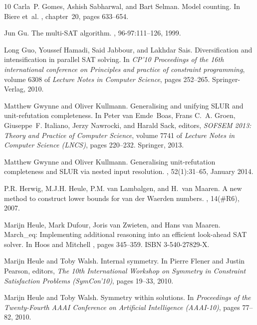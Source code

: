\documentclass[final,3p,times]{elsarticle}
\theoremstyle{definition}
\begin{document}
\begin{thebibliography}{10}
Carla~P. Gomes, Ashish Sabharwal, and Bart Selman.
\newblock Model counting.
\newblock In Biere et~al. \cite{2008HandbuchSAT}, chapter~20, pages 633--654.

Jun Gu.
\newblock The multi-{SAT} algorithm.
, 96-97:111--126, 1999.

Long Guo, Youssef Hamadi, Said Jabbour, and Lakhdar Sais.
\newblock Diversification and intensification in parallel {SAT} solving.
\newblock In {\em CP'10 Proceedings of the 16th international conference on
  Principles and practice of constraint programming}, volume 6308 of {\em
  Lecture Notes in Computer Science}, pages 252--265. Springer-Verlag, 2010.

Matthew Gwynne and Oliver Kullmann.
\newblock Generalising and unifying {SLUR} and unit-refutation completeness.
\newblock In Peter van Emde~Boas, Frans C.~A. Groen, Giuseppe~F. Italiano,
  Jerzy Nawrocki, and Harald Sack, editors, {\em SOFSEM 2013: Theory and
  Practice of Computer Science}, volume 7741 of {\em Lecture Notes in Computer
  Science (LNCS)}, pages 220--232. Springer, 2013.

Matthew Gwynne and Oliver Kullmann.
\newblock Generalising unit-refutation completeness and {SLUR} via nested input
  resolution.
, 52(1):31--65, January 2014.

P.R. Herwig, M.J.H. Heule, P.M. van Lambalgen, and H.~van Maaren.
\newblock A new method to construct lower bounds for van der {W}aerden numbers.
, 14(\#{}R6), 2007.

Marijn Heule, Mark Dufour, Joris van Zwieten, and Hans van Maaren.
\newblock March\_eq: Implementing additional reasoning into an efficient
  look-ahead {SAT} solver.
\newblock In Hoos and Mitchell \cite{Vancouver2004b}, pages 345--359.
\newblock ISBN 3-540-27829-X.

Marijn Heule and Toby Walsh.
\newblock Internal symmetry.
\newblock In Pierre Flener and Justin Pearson, editors, {\em The 10th
  International Workshop on Symmetry in Constraint Satisfaction Problems
  (SymCon'10)}, pages 19--33, 2010.

Marijn Heule and Toby Walsh.
\newblock Symmetry within solutions.
\newblock In {\em Proceedings of the Twenty-Fourth AAAI Conference on
  Artificial Intelligence (AAAI-10)}, pages 77--82, 2010.


\end{thebibliography}
\end{document}

